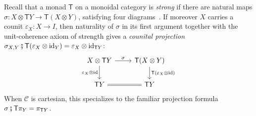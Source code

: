 \documentclass[11pt, oneside, article]{memoir}
\theoremstyle{definition}
\theoremstyle{plain}
\newcommand{\cat}[1]{\mathcal{#1}}%
\newcommand{\Fun}[1]{\mathsf{#1}}%
\newcommand{\id}{\mathrm{id}}
\newcommand{\then}{\mathbin{\fatsemi}}
\begin{document}
Recall that a monad $\Fun{T}$ on a monoidal category is \emph{strong} if there are natural maps $\sigma\colon X\otimes\Fun{T}Y\to\Fun{T}(X\otimes Y)$, satisfying four diagrams~\cite{kock1972strong}. If moreover $X$ carries a counit $\varepsilon_X\colon X\to I$, then naturality of $\sigma$ in its first argument together with the unit-coherence axiom of strength gives a \emph{counital projection} $\sigma_{X,Y}\then\Fun{T}(\varepsilon_X\otimes\id_Y)=\varepsilon_X\otimes\id_{\Fun{T}Y}$:
\begin{equation}\label{eqn.counital_projection}
\begin{tikzcd}
X\otimes\Fun{T}Y\ar[r, "\sigma"]\ar[d, "\varepsilon_X\otimes\id"']&
\Fun{T}(X\otimes Y)\ar[d, "\Fun{T}(\varepsilon_X\otimes\id)"]\\
\Fun{T}Y\ar[r, equal]&
\Fun{T}Y
\end{tikzcd}
\end{equation}
When $\cat{C}$ is cartesian, this specializes to the familiar projection formula $\sigma\then\Fun{T}\pi_Y=\pi_{\Fun{T}Y}$.
\end{document}

